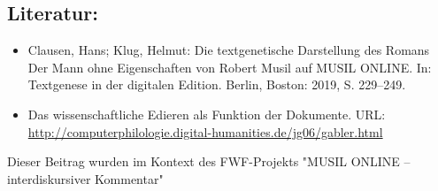 \documentclass{article}
\begin{document}
        \subsection*{Literatur:}\begin{itemize}\item Clausen, Hans; Klug, Helmut: Die textgenetische Darstellung des Romans Der Mann ohne
                              Eigenschaften von Robert Musil auf MUSIL ONLINE. In: Textgenese in der digitalen Edition. Berlin, Boston: 2019, S. 229–249.\item Das wissenschaftliche Edieren als Funktion der
                              Dokumente. URL: \url{http://computerphilologie.digital-humanities.de/jg06/gabler.html}\end{itemize}Dieser Beitrag wurden im Kontext des FWF-Projekts "MUSIL ONLINE – interdiskursiver Kommentar" 
\end{document}
